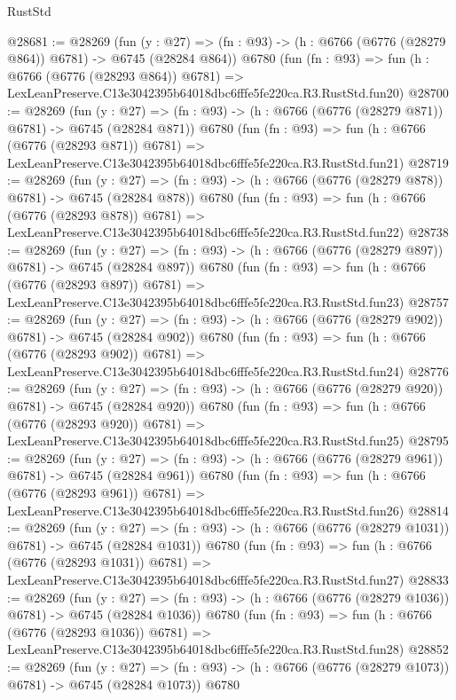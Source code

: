 \begin{lexlean}{RustStd}
\begin{coremodule}
@28681 := @28269
    (fun (y : @27) => (fn : @93) -> (h : @6766 (@6776 (@28279 @864)) @6781) -> @6745 (@28284 @864))
    @6780
    (fun (fn : @93) =>
    fun (h : @6766 (@6776 (@28293 @864)) @6781) =>
    LexLeanPreserve.C13e3042395b64018dbc6fffe5fe220ca.R3.RustStd.fun20)
@28700 := @28269
    (fun (y : @27) => (fn : @93) -> (h : @6766 (@6776 (@28279 @871)) @6781) -> @6745 (@28284 @871))
    @6780
    (fun (fn : @93) =>
    fun (h : @6766 (@6776 (@28293 @871)) @6781) =>
    LexLeanPreserve.C13e3042395b64018dbc6fffe5fe220ca.R3.RustStd.fun21)
@28719 := @28269
    (fun (y : @27) => (fn : @93) -> (h : @6766 (@6776 (@28279 @878)) @6781) -> @6745 (@28284 @878))
    @6780
    (fun (fn : @93) =>
    fun (h : @6766 (@6776 (@28293 @878)) @6781) =>
    LexLeanPreserve.C13e3042395b64018dbc6fffe5fe220ca.R3.RustStd.fun22)
@28738 := @28269
    (fun (y : @27) => (fn : @93) -> (h : @6766 (@6776 (@28279 @897)) @6781) -> @6745 (@28284 @897))
    @6780
    (fun (fn : @93) =>
    fun (h : @6766 (@6776 (@28293 @897)) @6781) =>
    LexLeanPreserve.C13e3042395b64018dbc6fffe5fe220ca.R3.RustStd.fun23)
@28757 := @28269
    (fun (y : @27) => (fn : @93) -> (h : @6766 (@6776 (@28279 @902)) @6781) -> @6745 (@28284 @902))
    @6780
    (fun (fn : @93) =>
    fun (h : @6766 (@6776 (@28293 @902)) @6781) =>
    LexLeanPreserve.C13e3042395b64018dbc6fffe5fe220ca.R3.RustStd.fun24)
@28776 := @28269
    (fun (y : @27) => (fn : @93) -> (h : @6766 (@6776 (@28279 @920)) @6781) -> @6745 (@28284 @920))
    @6780
    (fun (fn : @93) =>
    fun (h : @6766 (@6776 (@28293 @920)) @6781) =>
    LexLeanPreserve.C13e3042395b64018dbc6fffe5fe220ca.R3.RustStd.fun25)
@28795 := @28269
    (fun (y : @27) => (fn : @93) -> (h : @6766 (@6776 (@28279 @961)) @6781) -> @6745 (@28284 @961))
    @6780
    (fun (fn : @93) =>
    fun (h : @6766 (@6776 (@28293 @961)) @6781) =>
    LexLeanPreserve.C13e3042395b64018dbc6fffe5fe220ca.R3.RustStd.fun26)
@28814 := @28269
    (fun (y : @27) =>
    (fn : @93) -> (h : @6766 (@6776 (@28279 @1031)) @6781) -> @6745 (@28284 @1031))
    @6780
    (fun (fn : @93) =>
    fun (h : @6766 (@6776 (@28293 @1031)) @6781) =>
    LexLeanPreserve.C13e3042395b64018dbc6fffe5fe220ca.R3.RustStd.fun27)
@28833 := @28269
    (fun (y : @27) =>
    (fn : @93) -> (h : @6766 (@6776 (@28279 @1036)) @6781) -> @6745 (@28284 @1036))
    @6780
    (fun (fn : @93) =>
    fun (h : @6766 (@6776 (@28293 @1036)) @6781) =>
    LexLeanPreserve.C13e3042395b64018dbc6fffe5fe220ca.R3.RustStd.fun28)
@28852 := @28269
    (fun (y : @27) =>
    (fn : @93) -> (h : @6766 (@6776 (@28279 @1073)) @6781) -> @6745 (@28284 @1073))
    @6780

\end{coremodule}
\end{lexlean}
